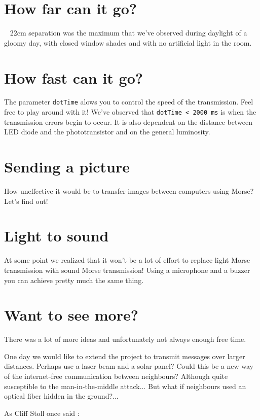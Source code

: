 \documentclass[12pt]{report}
\begin{document}
\section{How far can it go?}

~ 22cm separation was the maximum that we've observed during daylight of a gloomy day, with closed window shades and with no artificial light in the room.


\section{How fast can it go?}

The parameter \verb|dotTime| alows you to control the speed of the transmission. Feel free to play around with it! We've observed that \verb|dotTime < 2000 ms| is when the transmission errors begin to occur. It is also dependent on the distance between LED diode and the phototransistor and on the general luminosity.


\section{Sending a picture}

How uneffective it would be to transfer images between computers using Morse? Let's find out!

\section{Light to sound}

At some point we realized that it won't be a lot of effort to replace light Morse transmission with sound Morse transmission! Using a microphone and a buzzer you can achieve pretty much the same thing.

\section{Want to see more?}

There was a lot of more ideas and unfortunately not always enough free time.

One day we would like to extend the project to transmit messages over larger distances. Perhaps use a laser beam and a solar panel? Could this be a new way of the internet-free communication between neighbours? Although quite susceptible to the man-in-the-middle attack... But what if neighbours used an optical fiber hidden in the ground?...

As Cliff Stoll once said \cite{cliff_stoll}: 
\end{document}
